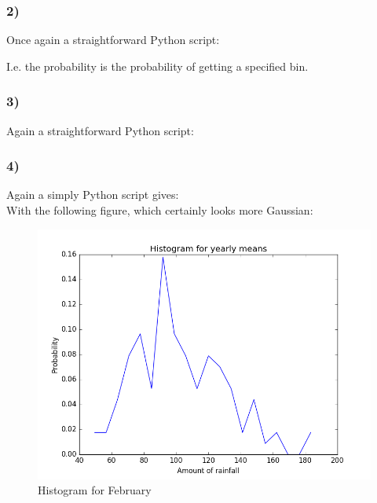 \documentclass[a4paper,10pt,english]{article}
\begin{document}
\subsubsection*{2)}
Once again a straightforward Python script:

I.e. the probability is the probability of getting a specified bin.
\subsubsection*{3)}
Again a straightforward Python script:\\

\subsubsection*{4)}
Again a simply Python script gives:\\

With the following figure, which certainly looks more Gaussian:
\begin{figure}[h!]
        \centering 
        \includegraphics[scale=0.5]{yearly_means.png} 
        \caption{Histogram for February}
        \label{fig:Yearly_Means}
\end{figure}
\end{document}
